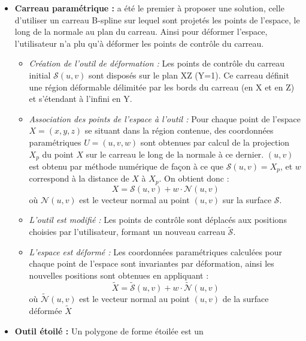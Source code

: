 \begin{itemize}
\item{\textbf{Carreau paramétrique :}} \cite{JLQ96} a été le premier à
  proposer une solution, celle d'utiliser un carreau B-spline sur
  lequel sont projetés les points de l'espace, le long de la normale au
  plan du carreau. Ainsi pour déformer l'espace, l'utilisateur n'a plu
  qu'à déformer les points de contrôle du carreau.
  \begin{itemize}
  \item{\textit{Création de l'outil de déformation :}} Les points de
    contrôle du carreau initial \( \mathcal{S}(u,v) \) sont disposés
    sur le plan XZ (Y=1). Ce carreau définit une région déformable
    délimitée par les bords du carreau (en X et en Z) et s'étendant à
    l'infini en Y.
  \item{\textit{Association des points de l'espace à l'outil :}} Pour
    chaque point de l'espace \( X = (x,y,z) \) se situant dans la
    région contenue, des coordonnées paramétriques \( U = (u,v,w) \)
    sont obtenues par calcul de la projection \( X_p \) du point \( X
    \) sur le carreau le long de la normale à ce dernier. \( (u,v) \)
    est obtenu par méthode numérique de façon à ce que \(
    \mathcal{S}(u,v) = X_p \), et \( w \) correspond à la distance de
    \( X \) à \( X_p \). On obtient donc :
    \begin{equation}
      X = \mathcal{S}(u,v) + w \cdot \mathcal{N}(u,v)
    \end{equation}
    où \( \mathcal{N}(u,v) \) est le vecteur normal au point \( (u,v)
    \) sur la surface \( \mathcal{S} \).
  \item{\textit{L'outil est modifié :}} Les points de contrôle sont
    déplacés aux positions choisies par l'utilisateur, formant un
    nouveau carreau \( \tilde{\mathcal{S}} \).
  \item{\textit{L'espace est déformé :}} Les coordonnées paramétriques
    calculées pour chaque point de l'espace sont invariantes par
    déformation, ainsi les nouvelles positions sont obtenues en
    appliquant :
    \begin{equation}
      \tilde{X} = \tilde{\mathcal{S}}(u,v) + w \cdot \tilde{\mathcal{N}}(u,v)
    \end{equation}
    où \( \tilde{\mathcal{N}}(u,v) \) est le vecteur normal au point
    \( (u,v) \) de la surface déformée \( \tilde{X} \)
  \end{itemize}
\item{\textbf{Outil étoilé :}} Un polygone de forme étoilée est un

\end{itemize}
